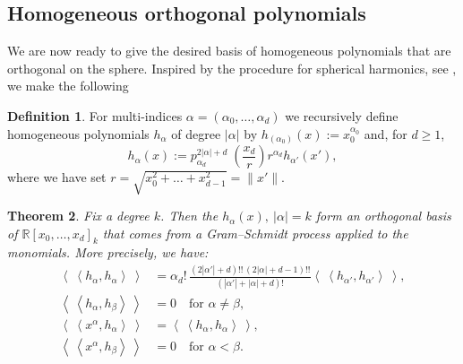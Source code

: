 \documentclass{amsart}
\newcommand{\p}[2]{p_{#1}^{#2}\;\!\!}
\newcommand{\coloneqq}{:=}
\newcommand{\bra}{\left<\!\!\!\:\left<}
\newcommand{\ket}{\right>\!\!\!\:\right>}
\newcommand{\R}{\mathbb{R}}
\theoremstyle{plain}
\newtheorem{theorem}{Theorem}[section]
\theoremstyle{definition}
\newtheorem{definition}[theorem]{Definition}
\theoremstyle{remark}
\begin{document}
\subsection{Homogeneous orthogonal polynomials} \label{hsection}
We are now ready to give the desired basis of homogeneous polynomials that are orthogonal on the sphere. Inspired by the procedure for spherical harmonics, see \cite[p.~35]{Dunkl}, we make the following
\begin{definition} \label{hdef}
For multi-indices $\alpha=(\alpha_0,\ldots,\alpha_d)$ we recursively define homogeneous polynomials $h_\alpha$ of degree $|\alpha |$ by $h_{(\alpha_0)}(x) \coloneqq x_0^{\alpha_0}$ and, for $d\geq 1$,
$$
h_\alpha(x) \coloneqq \p{\alpha_d}{2|\alpha |+d}\left(\frac{x_d}{r}\right) r^{\alpha_d}h_{\alpha'}(x'),
$$
where we have set $r=\sqrt{x_0^2 +\ldots+x_{d-1}^2}=\|x'\|$.
\end{definition}
\begin{theorem} Fix a degree $k$.
Then the $h_\alpha(x),\ |\alpha|=k$ form an orthogonal basis of $\R[x_0,\ldots,x_d]_k$ that comes from a Gram--Schmidt process applied to the monomials. More precisely, we have:
\begin{align} \label{hth1}
\bra h_\alpha ,h_\alpha \ket &= \alpha_d!\,\frac{\left(2|\alpha '|\!+\!d\right)!!\,\left(2|\alpha |\!+\!d\!-\!1\right)!!}{\left(|\alpha '|+|\alpha |+d\right)!}\bra h_{\alpha '},h_{\alpha '}\ket ,\\
\label{hth2}
\bra h_\alpha,h_\beta \ket &= 0 \quad\text{for }\alpha\neq\beta,\\
\label{hth3}
\bra x^\alpha, h_\alpha \ket &= \bra h_\alpha ,h_\alpha \ket ,\\
\label{hth4}
\bra x^\alpha,h_\beta \ket &= 0 \quad\text{for }\alpha < \beta.
\end{align}
\end{theorem}
\end{document}

